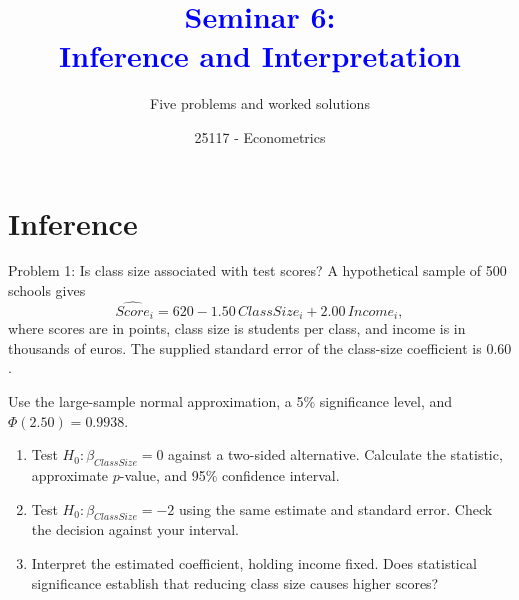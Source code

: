\documentclass[notes,10pt, aspectratio=169]{beamer}
\title[]{\textcolor{blue}{Seminar 6:\\Inference and Interpretation}}
\subtitle{Five problems and worked solutions}
\author{25117 - Econometrics}
\institute[shortinst]{Universitat Pompeu Fabra}
\date{}
\newif\ifshowsolutions
\newcommand{\answerpart}[1]{\textcolor{blue}{\textbf{#1.}}\,}
\begin{document}
\begin{frame}[plain]
\maketitle
\end{frame}

\section{Inference}
\begin{frame}{Problem 1: Is class size associated with test scores?}
\small
A hypothetical sample of 500 schools gives
\[
\widehat{Score}_i=620-1.50\,ClassSize_i+2.00\,Income_i,
\]
where scores are in points, class size is students per class, and income is in thousands of euros. The supplied standard error of the class-size coefficient is $0.60$.
\par\smallskip
Use the large-sample normal approximation, a 5\% significance level, and $\Phi(2.50)=0.9938$.
\begin{enumerate}
\item Test $H_0:\beta_{ClassSize}=0$ against a two-sided alternative. Calculate the statistic, approximate $p$-value, and 95\% confidence interval.
\item Test $H_0:\beta_{ClassSize}=-2$ using the same estimate and standard error. Check the decision against your interval.
\item Interpret the estimated coefficient, holding income fixed. Does statistical significance establish that reducing class size causes higher scores?
\end{enumerate}
\end{frame}

\ifshowsolutions
\begin{frame}{Solution 1: Tests, confidence interval, and interpretation}
\small
\answerpart{1}For the zero null,
\[
t=\frac{-1.50}{0.60}=-2.50,\text{ and }p\approx2[1-\Phi(2.50)]=0.0124.
\]
Reject at 5\%, since $|t|>1.96$ and $p<0.05$. The interval is
\[
-1.50\pm1.96(0.60)=[-2.676,-0.324].
\]
\answerpart{2}For the null value $-2$,
\[
t=\frac{-1.50-(-2)}{0.60}=0.8333.
\]
Do not reject: $|t|<1.96$, and $-2$ lies inside the 95\% interval.
\par\smallskip
\answerpart{3}An additional student per class is associated with a 1.50-point lower predicted score, holding district income fixed. The test concerns the regression coefficient. A causal interpretation also requires credible control of confounding; significance alone does not establish causality.
\end{frame}
\fi
\end{document}
